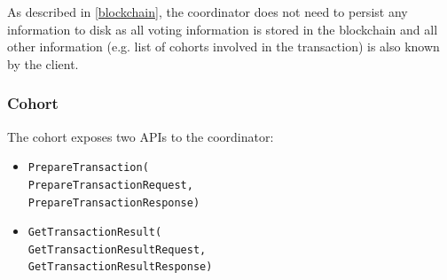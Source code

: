 \documentclass[11pt,sigplan,screen,nonacm]{acmart}
\begin{document}
As described in \ref{blockchain}, the coordinator does not need to persist any information to disk as all voting information is stored in the blockchain and all other information (e.g. list of cohorts involved in the transaction) is also known by the client.

\subsubsection{Cohort} \label{cohort}
The cohort exposes two APIs to the coordinator:
\begin{itemize}
  \item \texttt{PrepareTransaction(\\PrepareTransactionRequest,\\PrepareTransactionResponse)}
  \item \texttt{GetTransactionResult(\\GetTransactionResultRequest,\\GetTransactionResultResponse)}
\end{itemize} 
\end{document}
